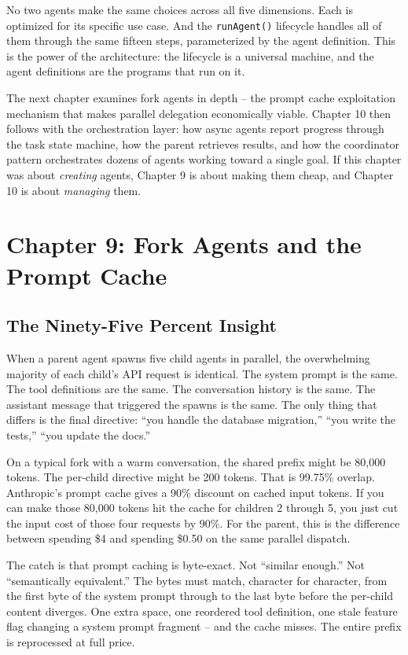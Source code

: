 \documentclass[
  english,
  11pt,
  letterpaper,
]{book}
\begin{document}
No two agents make the same choices across all five dimensions. Each is
optimized for its specific use case. And the \texttt{runAgent()}
lifecycle handles all of them through the same fifteen steps,
parameterized by the agent definition. This is the power of the
architecture: the lifecycle is a universal machine, and the agent
definitions are the programs that run on it.

The next chapter examines fork agents in depth -- the prompt cache
exploitation mechanism that makes parallel delegation economically
viable. Chapter 10 then follows with the orchestration layer: how async
agents report progress through the task state machine, how the parent
retrieves results, and how the coordinator pattern orchestrates dozens
of agents working toward a single goal. If this chapter was about
\emph{creating} agents, Chapter 9 is about making them cheap, and
Chapter 10 is about \emph{managing} them.

\chapter{Chapter 9: Fork Agents and the Prompt
Cache}\label{chapter-9-fork-agents-and-the-prompt-cache}

\section{The Ninety-Five Percent
Insight}\label{the-ninety-five-percent-insight}

When a parent agent spawns five child agents in parallel, the
overwhelming majority of each child's API request is identical. The
system prompt is the same. The tool definitions are the same. The
conversation history is the same. The assistant message that triggered
the spawns is the same. The only thing that differs is the final
directive: ``you handle the database migration,'' ``you write the
tests,'' ``you update the docs.''

On a typical fork with a warm conversation, the shared prefix might be
80,000 tokens. The per-child directive might be 200 tokens. That is
99.75\% overlap. Anthropic's prompt cache gives a 90\% discount on
cached input tokens. If you can make those 80,000 tokens hit the cache
for children 2 through 5, you just cut the input cost of those four
requests by 90\%. For the parent, this is the difference between
spending \$4 and spending \$0.50 on the same parallel dispatch.

The catch is that prompt caching is byte-exact. Not ``similar enough.''
Not ``semantically equivalent.'' The bytes must match, character for
character, from the first byte of the system prompt through to the last
byte before the per-child content diverges. One extra space, one
reordered tool definition, one stale feature flag changing a system
prompt fragment -- and the cache misses. The entire prefix is
reprocessed at full price.
\end{document}
